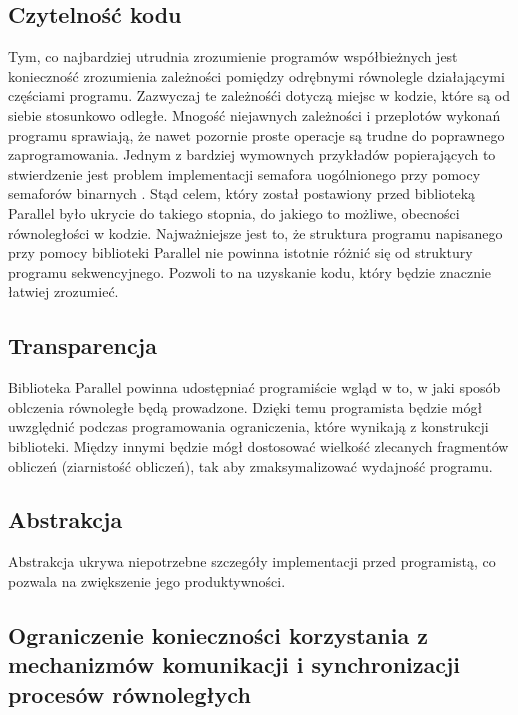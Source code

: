 \subsection{Czytelność kodu}

  Tym, co najbardziej utrudnia zrozumienie programów współbieżnych jest konieczność zrozumienia zależności pomiędzy odrębnymi równolegle działającymi częściami programu.
  Zazwyczaj te zależnośći dotyczą miejsc w kodzie, które są od siebie stosunkowo odległe.
  Mnogość niejawnych zależności i przeplotów wykonań programu sprawiają, że nawet pozornie proste operacje są trudne do poprawnego zaprogramowania.
  Jednym z bardziej wymownych przykładów popierających to stwierdzenie jest problem implementacji semafora uogólnionego przy pomocy semaforów binarnych \cite{gensem}.
  Stąd celem, który został postawiony przed biblioteką Parallel było ukrycie do takiego stopnia, do jakiego to możliwe, obecności równoległości w kodzie.
  Najważniejsze jest to, że struktura programu napisanego przy pomocy biblioteki Parallel nie powinna istotnie różnić się od struktury programu sekwencyjnego.
  Pozwoli to na uzyskanie kodu, który będzie znacznie łatwiej zrozumieć.

\subsection{Transparencja}

  Biblioteka Parallel powinna udostępniać programiście wgląd w to, w jaki sposób oblczenia równoległe będą prowadzone.
  Dzięki temu programista będzie mógł uwzględnić podczas programowania ograniczenia, które wynikają z konstrukcji biblioteki.
  Między innymi będzie mógł dostosować wielkość zlecanych fragmentów obliczeń (ziarnistość obliczeń), tak aby zmaksymalizować wydajność programu.
  
\subsection{Abstrakcja}

  Abstrakcja ukrywa niepotrzebne szczegóły implementacji przed programistą, co pozwala na zwiększenie jego produktywności.

\subsection{Ograniczenie konieczności korzystania z mechanizmów komunikacji i synchronizacji procesów równoległych}

